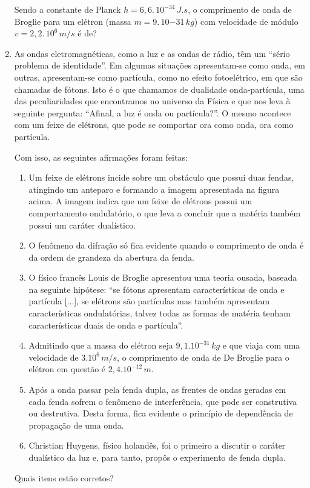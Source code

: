 \documentclass[12pt,letterpaper,fleqn]{article}
\begin{document}
\begin{enumerate}
Sendo a constante de Planck $h = 6,6.\,10^{-34}\,J.s$, o comprimento de onda de Broglie para um elétron (massa $m = 9.\,10{-31}\,kg$) com velocidade de módulo $v = 2,2.\,10^6\,m/s$ é de?

\item As ondas eletromagnéticas, como a luz e as ondas de rádio, têm um “sério problema de identidade”. Em algumas situações apresentam-se como onda, em outras, apresentam-se como partícula, como no efeito fotoelétrico, em que são chamadas de fótons. Isto é o que chamamos de dualidade onda-partícula, uma das peculiaridades que encontramos no universo da Física e que nos leva à seguinte pergunta: “Afinal, a luz é onda ou partícula?”. O mesmo acontece com um feixe de elétrons, que pode se comportar ora como onda, ora como partícula.

Com isso, as seguintes afirmações foram feitas:
\begin{enumerate}[I]
    \item Um feixe de elétrons incide sobre um obstáculo que possui duas fendas, atingindo um anteparo e formando a imagem apresentada na figura acima. A imagem indica que um feixe de elétrons possui um comportamento ondulatório, o que leva a concluir que a matéria também possui um caráter dualístico.
    \item O fenômeno da difração só fica evidente quando o comprimento de onda é da ordem de grandeza da abertura da fenda.
    \item O físico francês Louis de Broglie apresentou uma teoria ousada, baseada na seguinte hipótese: “se fótons apresentam características de onda e partícula [...], se elétrons são partículas mas também apresentam características ondulatórias, talvez todas as formas de matéria tenham características duais de onda e partícula”.
    \item Admitindo que a massa do elétron seja $9,1.10^{-31}\, kg$ e que viaja com uma velocidade de $3.10^6\,m/s$, o comprimento de onda de De Broglie para o elétron em questão é $2,4.10^{-12}\, m$.
    \item Após a onda passar pela fenda dupla, as frentes de ondas geradas em cada fenda sofrem o fenômeno de interferência, que pode ser construtiva ou destrutiva. Desta forma, fica evidente o princípio de dependência de propagação de uma onda.
    \item Christian Huygens, físico holandês, foi o primeiro a discutir o caráter dualístico da luz e, para tanto, propôs o experimento de fenda dupla.
\end{enumerate}
Quais itens estão corretos?


\end{enumerate}
\end{document}
